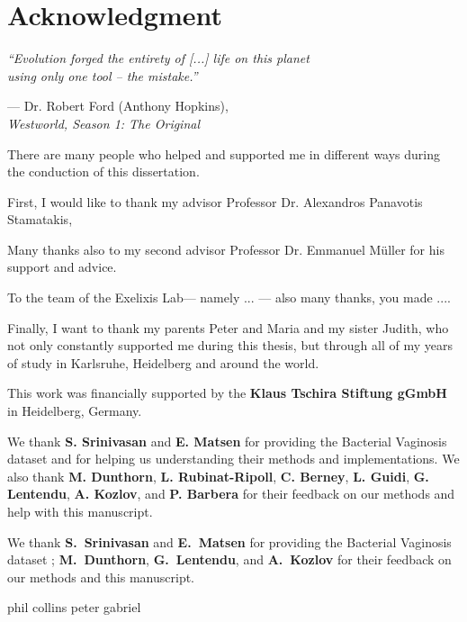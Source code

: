 \section*{Acknowledgment}
\vspace*{1em}

\epigraph
{\textit{``Evolution forged the entirety of [...] life on this planet \\ using only one tool -- the mistake.''}}
{--- Dr. Robert Ford (Anthony Hopkins),\\ \textit{Westworld, Season 1: The Original}}

There are many people who helped and supported me in different ways during the conduction of this dissertation.

First, I would like to thank my advisor Professor Dr. Alexandros Panavotis Stamatakis,

Many thanks also to my second advisor Professor Dr. Emmanuel Müller for his support and advice.

To the team of the Exelixis Lab--- namely ... --- also many thanks, you made ....

Finally, I want to thank my parents Peter and Maria and my sister Judith,
who not only constantly supported me during this thesis,
but through all of my years of study in Karlsruhe, Heidelberg and around the world.


This work was financially supported by the \textbf{Klaus Tschira Stiftung gGmbH} in Heidelberg, Germany.

We thank \textbf{S. Srinivasan} and \textbf{E. Matsen}
for providing the Bacterial Vaginosis dataset \cite{Srinivasan2012}
and for helping us understanding their methods and implementations.
We also thank \textbf{M. Dunthorn}, \textbf{L. Rubinat-Ripoll}, \textbf{C. Berney}, \textbf{L. Guidi},
\textbf{G. Lentendu}, %
\textbf{A. Kozlov}, and \textbf{P. Barbera}
for their feedback on our methods and help with this manuscript.

We thank \textbf{S.~Srinivasan} and \textbf{E.~Matsen}
for providing the Bacterial Vaginosis dataset \citep{Srinivasan2012};
\textbf{M.~Dunthorn}, \textbf{G.~Lentendu}, %
and \textbf{A.~Kozlov}
for their feedback on our methods and this manuscript.

phil collins peter gabriel



